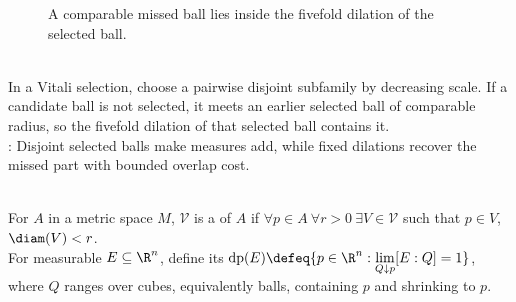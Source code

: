 \begin{figure}[H]
  \centering
  
  \caption{A comparable missed ball lies inside the fivefold dilation of the selected ball.}
  \label{fig:vitali-fivefold-dilation}
\end{figure}

\begin{perspective} \label{per:vitali-covering-fivefold-control} \\
In a Vitali selection, choose a pairwise disjoint subfamily by decreasing scale. If a candidate ball is not selected, it meets an earlier selected ball of comparable radius, so the fivefold dilation of that selected ball contains it.\\
: Disjoint selected balls make measures add, while fixed dilations recover the missed part with bounded overlap cost.
\end{perspective}

\begin{definition} \label{def:vitali-coverings-and-density-points} \\
For $A$ in a metric space $M$, $\mathcal{V}$ is a  of $A$ if $\forall p\in A\ \forall r>0\ \exists V\in\mathcal{V}$ such that $p\in V$, $\diam(V)<r$.\\
For measurable $E\subseteq\R^n$, define its  $\operatorname{dp}(E)\defeq\{p\in\R^n:\lim\limits_{Q\downarrow p}[E:Q]=1\}$, where $Q$ ranges over cubes, equivalently balls, containing $p$ and shrinking to $p$.
\end{definition}

